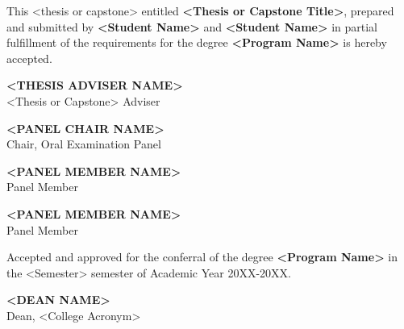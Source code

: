\begin{approvalPage}

  This <thesis or capstone> entitled \textbf{<Thesis or Capstone Title>}, prepared and submitted by \textbf{<Student Name>} and \textbf{<Student Name>} in partial fulfillment of the requirements for the degree \textbf{<Program Name>} is hereby accepted.

  \vspace{2cm}

  \centering

  \textbf{<THESIS ADVISER NAME>} \\
  <Thesis or Capstone> Adviser

  \vspace{1.5cm}

  \textbf{<PANEL CHAIR NAME>} \\
  Chair, Oral Examination Panel

  \vspace{1.5cm}

  \noindent
  \begin{minipage}[t]{0.45\textwidth}
    \centering
    \textbf{<PANEL MEMBER NAME>} \\
    Panel Member
  \end{minipage}%
  \hfill
  \begin{minipage}[t]{0.45\textwidth}
    \centering
    \textbf{<PANEL MEMBER NAME>} \\
    Panel Member
  \end{minipage}

  \vspace{2cm}

  \centering
  Accepted and approved for the conferral of the degree \textbf{<Program Name>} in the <Semester> semester of Academic Year 20XX-20XX.

  \vspace{1.5cm}

  \noindent
  \hfill
  \begin{minipage}[t]{0.45\textwidth}
    \centering
    \textbf{<DEAN NAME>} \\
    Dean, <College Acronym>
  \end{minipage}

  \clearpage

\end{approvalPage}

